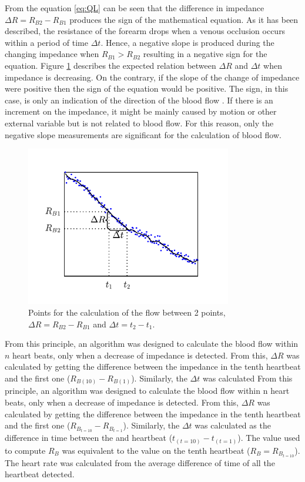 From the equation \ref{eq:QL}  can be seen that the difference in impedance $\Delta R = R_{B2} - R_{B1}$ produces the sign of the mathematical equation. As it has been described, the resistance of the forearm drops when a venous occlusion occurs within a period of time $\Delta t$. Hence, a negative slope is produced during the changing impedance when $R_{B1} > R_{B2}$ resulting in a negative sign for the equation. Figure \ref{fig:relation R vs t} describes the expected relation between $\Delta R$ and $\Delta t$ when impedance is decreasing. On the contrary, if the slope of the change of impedance were positive then the sign of the equation would be positive. The sign, in this case, is only an indication of the direction of the blood flow . If there is an increment on the impedance, it might be mainly caused by motion or other external variable but is not related to blood flow. For this reason, only the negative slope measurements are significant for the calculation of blood flow.

\begin{figure}[!htpb]
	\centering
	\includegraphics[width=9cm,keepaspectratio]{figure_vop_13}    
	\caption[Points for the calculation of the flow]{Points for the calculation of the flow between 2 points, $\Delta R = R_{B2} - R_{B1}$ and $\Delta t = t_2 - t_1$.}
	\label{fig:relation R vs t}
\end{figure}

From this principle, an algorithm was designed to calculate the blood flow within $n$ heart beats, only when a decrease of impedance is detected. From this, $\Delta R$ was calculated by getting the difference between the impedance in the tenth heartbeat and the first one ($R_{B(10)} - R_{B(1)}$).  Similarly, the $\Delta t$ was calculated From this principle, an algorithm was designed to calculate the blood flow within n heart beats, only when a decrease of impedance is detected. From this, $\Delta R$ was calculated by getting the difference between the impedance in the tenth heartbeat and the first one ($R_{B_{t=10}} - R_{B_{t=1}}$).  Similarly, the $\Delta t$ was calculated as the difference in time between the   and  heartbeat ($t_{(t=10)} - t_{(t=1)}$). The value used to compute $R_B$ was equivalent to the value on the tenth heartbeat ($R_B = R_{B_{t=10}}$). The heart rate was calculated from the average difference of time of all the heartbeat detected.

